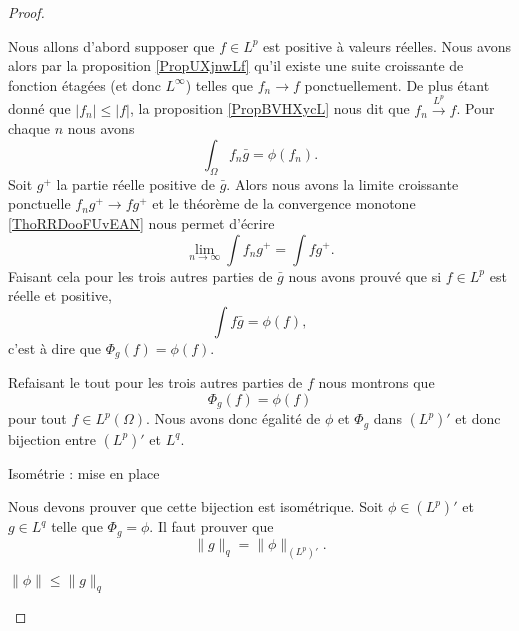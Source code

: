 \begin{proof}
\begin{subproof}
            Nous allons d'abord supposer que \( f\in L^p\) est positive à valeurs réelles. Nous avons alors par la proposition \ref{PropUXjnwLf} qu'il existe une suite croissante de fonction étagées (et donc \( L^{\infty}\)) telles que \( f_n\to f\) ponctuellement. De plus étant donné que \( | f_n |\leq | f |\), la proposition \ref{PropBVHXycL} nous dit que \( f_n\stackrel{L^p}{\longrightarrow}f\). Pour chaque \( n\) nous avons
            \begin{equation}
                \int_{\Omega}f_n\bar g=\phi(f_n).
            \end{equation}
            Soit \( g^+\) la partie réelle positive de \( \bar g\). Alors nous avons la limite croissante ponctuelle \( f_ng^+\to fg^+\) et le théorème de la convergence monotone \ref{ThoRRDooFUvEAN} nous permet d'écrire
            \begin{equation}
                \lim_{n\to \infty} \int f_ng^+=\int fg^+.
            \end{equation}
            Faisant cela pour les trois autres parties de \( \bar g\) nous avons prouvé que si \( f\in L^p\) est réelle et positive,
            \begin{equation}
                \int f\bar g=\phi(f),
            \end{equation}
            c'est à dire que \( \Phi_g(f)=\phi(f)\).

            Refaisant le tout pour les trois autres parties de \( f\) nous montrons que
            \begin{equation}
                \Phi_g(f)=\phi(f)
            \end{equation}
            pour tout \( f\in L^p(\Omega)\). Nous avons donc égalité de \( \phi\) et \( \Phi_g\) dans \(  (L^p)' \) et donc bijection entre \( (L^p)'\) et \( L^q\).

        \item[Isométrie : mise en place]

            Nous devons prouver que cette bijection est isométrique. Soit \( \phi\in (L^p)'\) et \( g\in L^q\) telle que \( \Phi_g=\phi\). Il faut prouver que
            \begin{equation}
                \| g \|_q=\| \phi \|_{(L^p)'}.
            \end{equation}

        \item[ \( \| \phi \|\leq \| g \|_q\) ]


\end{subproof}
\end{proof}
